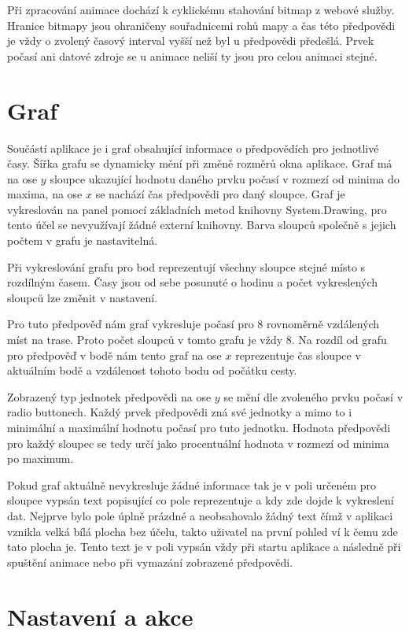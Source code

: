 \documentclass[czech,bachelor,dept460,male,csharp,cpdeclaration]{diploma}
\begin{document}
	Při zpracování animace dochází k cyklickému stahování bitmap z webové služby. Hranice bitmapy jsou ohraničeny souřadnicemi rohů mapy a čas této předpovědi je vždy o zvolený časový interval vyšší než byl u předpovědi předešlá. Prvek počasí ani datové zdroje se u animace neliší ty jsou pro celou animaci stejné.
	
	\section{Graf}
	
	Součástí aplikace je i graf obsahující informace o předpovědích pro jednotlivé časy. Šířka grafu se dynamicky mění při změně rozměrů okna aplikace. Graf má na ose $y$ sloupce ukazující hodnotu daného prvku počasí v rozmezí od minima do maxima, na ose $x$ se nachází čas předpovědi pro daný sloupce. Graf je vykreslován na panel pomocí základních metod knihovny System.Drawing, pro tento účel se nevyužívají žádné externí knihovny. Barva sloupců společně s jejich počtem v grafu je nastavitelná.
	
	Při vykreslování grafu pro bod reprezentují všechny sloupce stejné místo s rozdílným časem. Časy jsou od sebe posunuté o hodinu a počet vykreslených sloupců lze změnit v nastavení.
	
	Pro tuto předpověď nám graf vykresluje počasí pro 8 rovnoměrně vzdálených míst na trase. Proto počet sloupců v tomto grafu je vždy 8. Na rozdíl od grafu pro předpověď v bodě nám tento graf na ose $x$ reprezentuje čas sloupce v aktuálním bodě a vzdálenost tohoto bodu od počátku cesty.
	
	Zobrazený typ jednotek předpovědi na ose $y$ se mění dle zvoleného prvku počasí v radio buttonech. Každý prvek předpovědi zná své jednotky a mimo to i minimální a maximální hodnotu počasí pro tuto jednotku. Hodnota předpovědi pro každý sloupec se tedy určí jako procentuální hodnota v rozmezí od minima po maximum.
	
	Pokud graf aktuálně nevykresluje žádné informace tak je v poli určeném pro sloupce vypsán text popisující co pole reprezentuje a kdy zde dojde k vykreslení dat. Nejprve bylo pole úplně prázdné a neobsahovalo žádný text čímž v aplikaci vznikla velká bílá plocha bez účelu, takto uživatel na první pohled ví k čemu zde tato plocha je. Tento text je v poli vypsán vždy při startu aplikace a následně při spuštění animace nebo při vymazání zobrazené předpovědi.
	
	\section{Nastavení a akce}
	
\end{document}

